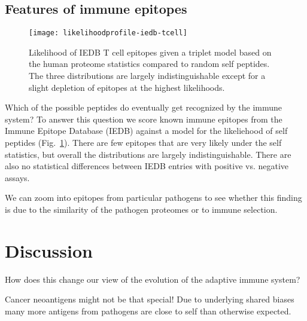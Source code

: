 \documentclass[superscriptaddress,twocolumn,pre]{revtex4}
\newcommand{\<}{\langle}
\renewcommand{\>}{\rangle}
\begin{document}



\subsection{Features of immune epitopes}

\begin{figure}
    \texttt{[image: likelihoodprofile-iedb-tcell]}
    \caption{Likelihood of IEDB T cell epitopes given a triplet model based on the human proteome statistics compared to random self peptides. The three distributions are largely indistinguishable except for a slight depletion of epitopes at the highest likelihoods.
    \label{figtcelliedb}
    }
\end{figure}

Which of the possible peptides do eventually get recognized by the immune system? To answer this question we score known immune epitopes from the Immune Epitope Database (IEDB) against a model for the likeliehood of self peptides (Fig.~\ref{figtcelliedb}). There are few epitopes that are very likely under the self statistics, but overall the distributions are largely indistinguishable. There are also no statistical differences between IEDB entries with positive vs. negative assays.

We can zoom into epitopes from particular pathogens to see whether this finding is due to the similarity of the pathogen proteomes or to immune selection.

\section{Discussion}

How does this change our view of the evolution of the adaptive immune system?

Cancer neoantigens might not be that special! Due to underlying shared biases many more antigens from 
pathogens are close to self than otherwise expected.
\end{document}
